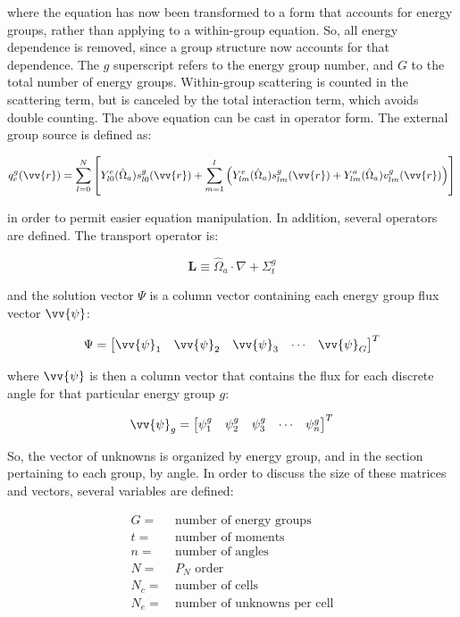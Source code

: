 \documentclass[10pt]{article}
\newcommand{\hO}{\hat{\Omega}}
\begin{document}
\begin{flushleft}
where the equation has now been transformed to a form that accounts for energy groups, rather than applying to a within-group equation. So, all energy dependence is removed, since a group structure now accounts for that dependence. The \(g\) superscript refers to the energy group number, and \(G\) to the total number of energy groups. Within-group scattering is counted in the scattering term, but is canceled by the total interaction term, which avoids double counting. The above equation can be cast in operator form. The external group source is defined as:

\begin{equation}
q_e^g(\vv{r})=\sum_{l=0}^{N}\left\lbrack Y_{l0}^e(\hO  _a)s_{l0}^g(\vv{r})+\sum_{m=1}^{l}\left(Y_{lm}^e(\hO  _a)s_{lm}^g(\vv{r})+Y_{lm}^o(\hO  _a)v_{lm}^g(\vv{r})\right)\right\rbrack
\end{equation}

in order to permit easier equation manipulation. In addition, several operators are defined. The transport operator is:

\begin{equation}
\textbf{L}\equiv\hO  _a\cdot\nabla+\Sigma_t^g
\end{equation}

and the solution vector \(\Psi\) is a column vector containing each energy group flux vector \(\vv{\psi}\):

\begin{equation}
\Psi=\begin{bmatrix}\vv{\psi}_1&\vv{\psi}_2&\vv{\psi}_3&\cdots&\vv{\psi}_G\end{bmatrix}^T
\end{equation}

where \(\vv{\psi}\) is then a column vector that contains the flux for each discrete angle for that particular energy group \(g\):

\begin{equation}
\vv{\psi}_g=\begin{bmatrix}\psi_1^g&\psi_2^g&\psi_3^g&\cdots&\psi_n^g\end{bmatrix}^T
\end{equation}

So, the vector of unknowns is organized by energy group, and in the section pertaining to each group, by angle. In order to discuss the size of these matrices and vectors, several variables are defined:

\begin{equation}
\begin{aligned}
G=&\ \text{number of energy groups}\\
t = &\ \text{number of moments}\\
n = &\ \text{number of angles}\\
N = &\ P_N\text{\ order}\\
N_c=&\ \text{number of cells}\\
N_e=&\ \text{number of unknowns per cell}\\
\end{aligned}
\end{equation} 


\end{flushleft}
\end{document}
